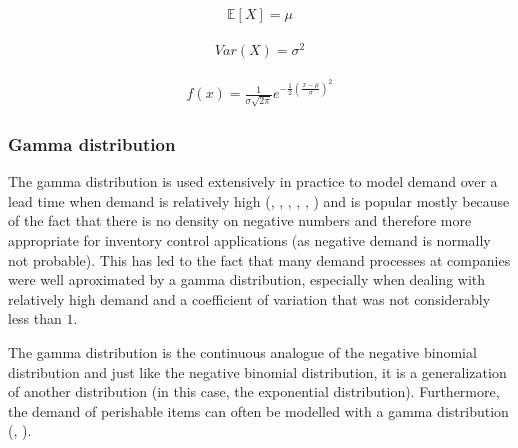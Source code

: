 \documentclass{article}
\begin{document}
\begin{align*}
    \mathbb{E}[X] = \mu
\end{align*}

\begin{align*}
    Var(X) = \sigma^2
\end{align*}

\begin{align*}
    f(x) = \frac{1}{\sigma\sqrt{2\pi}}e^{-\frac{1}{2}\left(\frac{x-\mu}{\sigma}\right)^2}
\end{align*}

\subsubsection{Gamma distribution}
\begin{flushleft}
    The gamma distribution is used extensively in practice to model demand over a lead time when demand is relatively high (\cite{8285761c-e9d6-323a-bbd4-de8efa04aa5d}, \cite{512d921f-2e73-3182-8129-e175ce204488}, \cite{https://doi.org/10.1002/nav.3800300216}, \cite{SNYDER1984373}, \cite{TIJMS1984175}, \cite{articleTyworth}) and is popular mostly because of the fact that there is no density on negative numbers and therefore more appropriate for inventory control applications (as negative demand is normally not probable).
    This has led to the fact that many demand processes at companies were well aproximated by a gamma distribution, especially when dealing with relatively high demand and a coefficient of variation that was not considerably less than $1$.
\end{flushleft}
\begin{flushleft}
    The gamma distribution is the continuous analogue of the negative binomial distribution and just like the negative binomial distribution, it is a generalization of another distribution (in this case, the exponential distribution).
    Furthermore, the demand of perishable items can often be modelled with a gamma distribution (\cite{BROEKMEULEN20093013}, \cite{d729dae9-eb3a-3171-85b1-0f6d6818b172}).
\end{flushleft}
\end{document}
